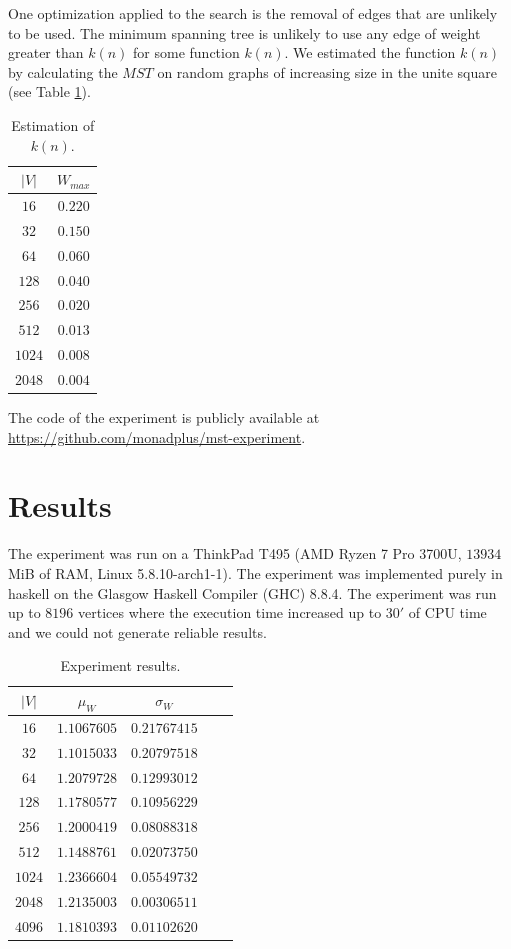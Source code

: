 \documentclass[12pt, a4paper]{article}
\begin{document}
One optimization applied to the search is the removal of edges that are unlikely to be used. The minimum spanning tree is unlikely to use any edge of weight greater than $k(n)$ for some function $k(n)$. We estimated the function $k(n)$ by calculating the $MST$ on random graphs of increasing size in the unite square (see Table \ref{table:2}).

\begin{table}[H]
  \center
  \begin{tabular}{cc}
    $|V|$  & $W_{max}$     \\ \hline
    $16$   & $0.220$ \\
    $32$   & $0.150$ \\
    $64$   & $0.060$ \\
    $128$  & $0.040$ \\
    $256$  & $0.020$ \\
    $512$  & $0.013$ \\
    $1024$ & $0.008$ \\
    $2048$ & $0.004$ \\
  \end{tabular}
  \caption{Estimation of $k(n)$.}
\label{table:2}
\end{table}

The code of the experiment is publicly available at \url{https://github.com/monadplus/mst-experiment}.

\section{Results}\label{sec:3}

The experiment was run on a ThinkPad T495 (AMD Ryzen 7 Pro 3700U, $13934$ MiB of RAM, Linux 5.8.10-arch1-1). The experiment was implemented purely in haskell on the Glasgow Haskell Compiler (GHC) 8.8.4. The experiment was run up to $8196$ vertices where the execution time increased up to $30'$ of CPU time and we could not generate reliable results.

\begin{table}[H]
  \center
  \begin{tabular}{ccccc}
    $|V|$  & $\mu_W$    & $\sigma_W$ \\ \hline
    $16$   & $1.1067605$ & $0.21767415$ \\
    $32$   & $1.1015033$ & $0.20797518$ \\
    $64$   & $1.2079728$ & $0.12993012$ \\
    $128$  & $1.1780577$ & $0.10956229$ \\
    $256$  & $1.2000419$ & $0.08088318$ \\
    $512$  & $1.1488761$ & $0.02073750$ \\
    $1024$ & $1.2366604$ & $0.05549732$ \\
    $2048$ & $1.2135003$ & $0.00306511$ \\
    $4096$ & $1.1810393$ & $0.01102620$
  \end{tabular}
\caption{Experiment results.}
\label{table:3}
\end{table}
\end{document}
